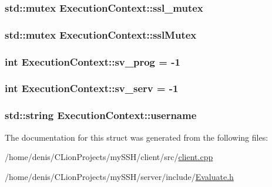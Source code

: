 \subsubsection[{\texorpdfstring{ssl\+\_\+mutex}{ssl_mutex}}]{\setlength{\rightskip}{0pt plus 5cm}std\+::mutex Execution\+Context\+::ssl\+\_\+mutex}\hypertarget{structExecutionContext_a241cad372197f9880a9af9e93ecd7633}{}\label{structExecutionContext_a241cad372197f9880a9af9e93ecd7633}
\subsubsection[{\texorpdfstring{ssl\+Mutex}{sslMutex}}]{\setlength{\rightskip}{0pt plus 5cm}std\+::mutex Execution\+Context\+::ssl\+Mutex}\hypertarget{structExecutionContext_aa4fa05fb3cc6f4f19d5b5019b3514ec5}{}\label{structExecutionContext_aa4fa05fb3cc6f4f19d5b5019b3514ec5}
\subsubsection[{\texorpdfstring{sv\+\_\+prog}{sv_prog}}]{\setlength{\rightskip}{0pt plus 5cm}int Execution\+Context\+::sv\+\_\+prog = -\/1}\hypertarget{structExecutionContext_a14419dd2173223d2e30444ec9d484d92}{}\label{structExecutionContext_a14419dd2173223d2e30444ec9d484d92}
\subsubsection[{\texorpdfstring{sv\+\_\+serv}{sv_serv}}]{\setlength{\rightskip}{0pt plus 5cm}int Execution\+Context\+::sv\+\_\+serv = -\/1}\hypertarget{structExecutionContext_aac8fa1ea0b889137efab488cb650cca1}{}\label{structExecutionContext_aac8fa1ea0b889137efab488cb650cca1}
\subsubsection[{\texorpdfstring{username}{username}}]{\setlength{\rightskip}{0pt plus 5cm}std\+::string Execution\+Context\+::username}\hypertarget{structExecutionContext_a6c1bbd4dcfc82e4902c4382af69ab6d9}{}\label{structExecutionContext_a6c1bbd4dcfc82e4902c4382af69ab6d9}


The documentation for this struct was generated from the following files\+:\begin{DoxyCompactItemize}
\item 
/home/denis/\+C\+Lion\+Projects/my\+S\+S\+H/client/src/\hyperlink{client_8cpp}{client.\+cpp}\item 
/home/denis/\+C\+Lion\+Projects/my\+S\+S\+H/server/include/\hyperlink{Evaluate_8h}{Evaluate.\+h}\end{DoxyCompactItemize}
